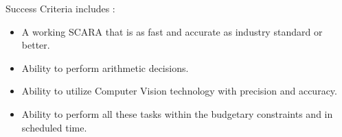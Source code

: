 Success Criteria includes : 
\begin{itemize}
    \item A working SCARA that is as fast and accurate as industry standard or better.
    \item Ability to perform arithmetic decisions.
    \item Ability to utilize Computer Vision technology with precision and accuracy.
    \item Ability to perform all these tasks within the budgetary constraints and in scheduled time.
\end{itemize}
